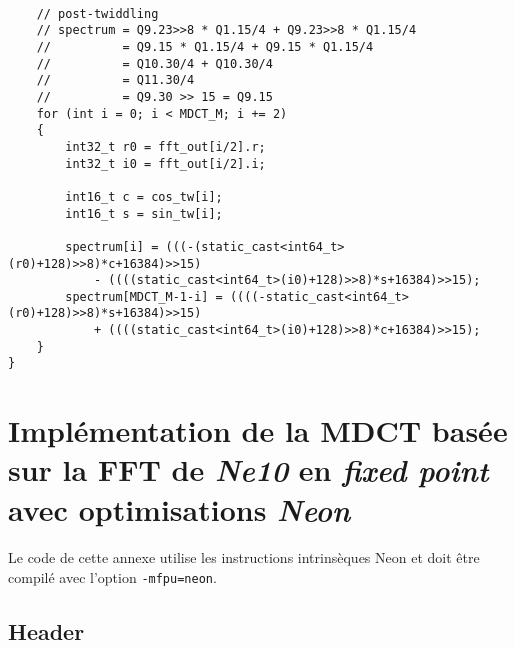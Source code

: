 \documentclass{article}
\begin{document}
\begin{lstlisting}

    // post-twiddling
    // spectrum = Q9.23>>8 * Q1.15/4 + Q9.23>>8 * Q1.15/4
    //          = Q9.15 * Q1.15/4 + Q9.15 * Q1.15/4
    //          = Q10.30/4 + Q10.30/4
    //          = Q11.30/4
    //          = Q9.30 >> 15 = Q9.15
    for (int i = 0; i < MDCT_M; i += 2)
    {
        int32_t r0 = fft_out[i/2].r;
        int32_t i0 = fft_out[i/2].i;

        int16_t c = cos_tw[i];
        int16_t s = sin_tw[i];

        spectrum[i] = (((-(static_cast<int64_t>(r0)+128)>>8)*c+16384)>>15) 
            - ((((static_cast<int64_t>(i0)+128)>>8)*s+16384)>>15);
        spectrum[MDCT_M-1-i] = ((((-static_cast<int64_t>(r0)+128)>>8)*s+16384)>>15) 
            + ((((static_cast<int64_t>(i0)+128)>>8)*c+16384)>>15);
    }
}
\end{lstlisting}




\newpage
\section{Implémentation de la MDCT basée sur la FFT de \emph{Ne10} en \emph{fixed point} avec optimisations \emph{Neon}}\label{app:mdct_ne10_i32_neon}
\paragraph{}
Le code de cette annexe utilise les instructions intrinsèques Neon et doit être compilé avec l'option \texttt{-mfpu=neon}.

\subsection{Header}\label{app:mdct_ne10_i32_neon_header}
\end{document}
